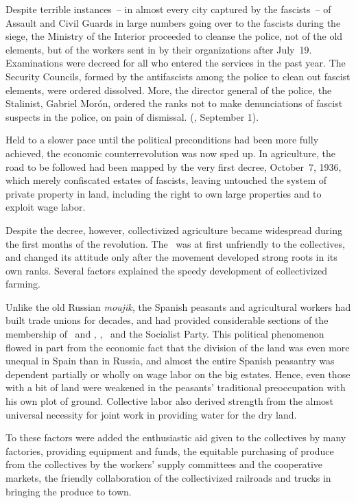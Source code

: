 Despite terrible instances~-- in almost every city captured by the fascists~-- of Assault and Civil Guards in large numbers going over to the fascists during the siege, the Ministry of the Interior proceeded to cleanse the police, not of the old elements, but of the workers sent in by their organizations after July~19. Examinations were decreed for all who entered the services in the past year. The Security Councils, formed by the antifascists among the police to clean out fascist elements, were ordered dissolved. More, the director general of the police, the Stalinist, Gabriel Mor\'on, ordered the ranks not to make denunciations of fascist suspects in the police, on pain of dismissal. (\emph{\CNT,} September 1).

Held to a slower pace until the political preconditions had been more fully achieved, the economic counterrevolution was now sped up. In agriculture, the road to be followed had been mapped by the very first decree, October~7, 1936, which merely confiscated estates of fascists, leaving untouched the system of private property in land, including the right to own large properties and to exploit wage labor.

\begin{sloppypar}
Despite the decree, however, collectivized agriculture became wide\-spread during the first months of the revolution. The \UGT\ was at first unfriendly to the collectives, and changed its attitude only after the movement developed strong roots in its own ranks. Several factors explained the speedy development of collectivized farming.
\end{sloppypar}

Unlike the old Russian \emph{moujik,} the Spanish peasants and agricultural workers had built trade unions for decades, and had provided considerable sections of the membership of \CNT\ and \FAI, \UGT\kn, \POUM\ and the Socialist Party. This political phenomenon flowed in part from the economic fact that the division of the land was even more unequal in Spain than in Russia, and almost the entire Spanish peasantry was dependent partially or wholly on wage labor on the big estates. Hence, even those with a bit of land were weakened in the peasants’ traditional preoccupation with his own plot of ground. Collective labor also derived strength from the almost universal necessity for joint work in providing water for the dry land.

To these factors were added the enthusiastic aid given to the collectives by many factories, providing equipment and funds, the equitable purchasing of produce from the collectives by the workers’ supply committees and the cooperative markets, the friendly collaboration of the collectivized railroads and trucks in bringing the produce to town.

